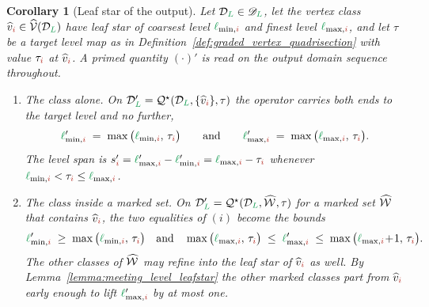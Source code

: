 \documentclass[a4paper, 12pt]{article}
\makeatletter
\newcommand{\quadriV}{\mathcal{Q}^{\star}}                       %
\newcommand{\quadriVup}[1]{\quadriV_{\rightarrow #1}}            %
\newcommand{\lminIdx}[1]{\l_{\min,#1}}
\newcommand{\lmaxIdx}[1]{\l_{\max,#1}}
\newcommand{\levelSpan}[1]{s_{#1}}
\newcommand{\targetlevel}{\tau}                                 %
\newcommand{\green}{\color{ForestGreen}}
\newcommand{\brickred}{\color{BrickRed}}
\newcommand{\V}{\mathcal{V}}
\newcommand{\vertexClass}[1]{\widehat{v}_{#1}}
\newcommand{\vertexClasses}{\widehat{\V}}
\DeclareRobustCommand{\markedVertexClasses}[1][]{\widehat{\mathcal{W}}\ifx\@empty#1\@empty\else^{#1}\fi}
\newcommand{\coarseIdxone}{{\brickred i}}
\renewcommand{\l}{{\green\ell}}
\renewcommand{\L}{{\green L}}
\newtheorem{corollary}[theorem]{Corollary}
\theoremstyle{definition}
\theoremstyle{plain}
\numberwithin{equation}{section}
\newcommand{\tobecut}[1]{{\color{red} #1}}     %
\DeclareRobustCommand{\domseq}[1][]{\mathcal{D}\ifx\@empty#1\@empty\else_{#1}\fi}
\newcommand{\alldomseqs}{\mathscr{D}}
\makeatother
\begin{document}
\begin{corollary}[Leaf star of the output]
    \label{cor:graded_quadrisection_leafstar}
    Let $\domseq[\L] \in \alldomseqs_\L$, let the vertex class $\vertexClass{\coarseIdxone} \in \vertexClasses(\domseq[\L])$ have leaf star of coarsest level $\lminIdx{\coarseIdxone}$ and finest level $\lmaxIdx{\coarseIdxone}$, and let $\targetlevel$ be a target level map as in Definition~\ref{def:graded_vertex_quadrisection} with value $\targetlevel_\coarseIdxone$ at $\vertexClass{\coarseIdxone}$. A primed quantity $(\cdot)'$ is read on the output domain sequence throughout.
    \begin{enumerate}[topsep=3pt, itemsep=-2pt]
        \item[$(i)$] \emph{The class alone.} On $\domseq[\L]' = \quadriV(\domseq[\L], \{ \vertexClass{\coarseIdxone} \}, \targetlevel)$ the operator carries both ends to the target level and no further,
        \begin{equation}
            \label{eq:graded_quadrisection_leafstar}
            \lminIdx{\coarseIdxone}' \; = \; \max \big( \lminIdx{\coarseIdxone}, \, \targetlevel_\coarseIdxone \big) \qquad \text{and} \qquad \lmaxIdx{\coarseIdxone}' \; = \; \max \big( \lmaxIdx{\coarseIdxone}, \, \targetlevel_\coarseIdxone \big) .
        \end{equation}
        The level span is $\levelSpan{\coarseIdxone}' = \lmaxIdx{\coarseIdxone}' - \lminIdx{\coarseIdxone}' = \lmaxIdx{\coarseIdxone} - \targetlevel_\coarseIdxone$ whenever $\lminIdx{\coarseIdxone} < \targetlevel_\coarseIdxone \leq \lmaxIdx{\coarseIdxone}$.

        \item[$(ii)$] \emph{The class inside a marked set.} On $\domseq[\L]' = \quadriV(\domseq[\L], \markedVertexClasses, \targetlevel)$ for a marked set $\markedVertexClasses$ that contains $\vertexClass{\coarseIdxone}$, the two equalities of $(i)$ become the bounds
        \begin{equation}
            \label{eq:graded_quadrisection_leafstar_set}
            \lminIdx{\coarseIdxone}' \; \geq \; \max \big( \lminIdx{\coarseIdxone}, \, \targetlevel_\coarseIdxone \big)
            \quad \text{and} \quad
            \max \big( \lmaxIdx{\coarseIdxone}, \, \targetlevel_\coarseIdxone \big) \; \leq \; \lmaxIdx{\coarseIdxone}' \; \leq \; \max \big( \lmaxIdx{\coarseIdxone} \! + \! 1, \, \targetlevel_\coarseIdxone \big) .
        \end{equation}
        The other classes of $\markedVertexClasses$ may refine into the leaf star of $\vertexClass{\coarseIdxone}$ as well. By Lemma~\ref{lemma:meeting_level_leafstar} the other marked classes part from $\vertexClass{\coarseIdxone}$ early enough to lift $\lmaxIdx{\coarseIdxone}'$ by at most one.


\end{enumerate}
\end{corollary}
\end{document}
